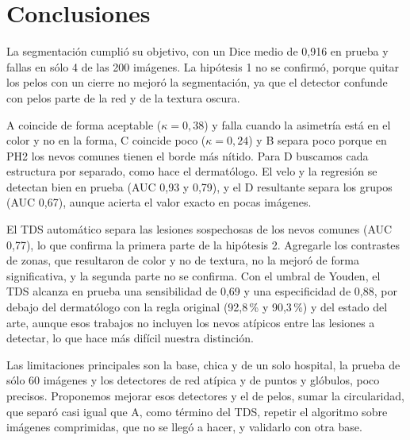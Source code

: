 \section{Conclusiones}
\label{sec:conclusiones}

La segmentación cumplió su objetivo, con un Dice medio de 0,916 en prueba y fallas en sólo 4 de las 200 imágenes. La hipótesis 1 no se confirmó, porque quitar los pelos con un cierre no mejoró la segmentación, ya que el detector confunde con pelos parte de la red y de la textura oscura.

A coincide de forma aceptable ($\kappa=0{,}38$) y falla cuando la asimetría está en el color y no en la forma, C coincide poco ($\kappa=0{,}24$) y B separa poco porque en PH2 los nevos comunes tienen el borde más nítido. Para D buscamos cada estructura por separado, como hace el dermatólogo. El velo y la regresión se detectan bien en prueba (AUC 0,93 y 0,79), y el D resultante separa los grupos (AUC 0,67), aunque acierta el valor exacto en pocas imágenes.

El TDS automático separa las lesiones sospechosas de los nevos comunes (AUC 0,77), lo que confirma la primera parte de la hipótesis 2. Agregarle los contrastes de zonas, que resultaron de color y no de textura, no la mejoró de forma significativa, y la segunda parte no se confirma. Con el umbral de Youden, el TDS alcanza en prueba una sensibilidad de 0,69 y una especificidad de 0,88, por debajo del dermatólogo con la regla original (92,8\,\% y 90,3\,\%) y del estado del arte, aunque esos trabajos no incluyen los nevos atípicos entre las lesiones a detectar, lo que hace más difícil nuestra distinción.

Las limitaciones principales son la base, chica y de un solo hospital, la prueba de sólo 60 imágenes y los detectores de red atípica y de puntos y glóbulos, poco precisos. Proponemos mejorar esos detectores y el de pelos, sumar la circularidad, que separó casi igual que A, como término del TDS, repetir el algoritmo sobre imágenes comprimidas, que no se llegó a hacer, y validarlo con otra base.
